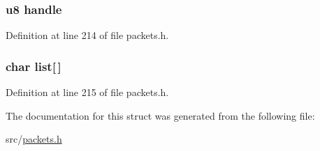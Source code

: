\subsubsection[{handle}]{ {\bf u8} handle}\label{struct_c_o_n_t_i_n_u_e___l_i_s_t___f_i_l_e_s___r_e_p_l_y_a2f1e90eb35c05582c8b60d001920036a}


Definition at line 214 of file packets.\+h.

\hypertarget{struct_c_o_n_t_i_n_u_e___l_i_s_t___f_i_l_e_s___r_e_p_l_y_aff445b895fa0846e460f0c83e186647d}{}
\subsubsection[{list}]{\setlength{\rightskip}{0pt plus 5cm}char list\mbox{[}$\,$\mbox{]}}\label{struct_c_o_n_t_i_n_u_e___l_i_s_t___f_i_l_e_s___r_e_p_l_y_aff445b895fa0846e460f0c83e186647d}


Definition at line 215 of file packets.\+h.



The documentation for this struct was generated from the following file\+:\begin{DoxyCompactItemize}
\item 
src/\hyperlink{packets_8h}{packets.\+h}\end{DoxyCompactItemize}
